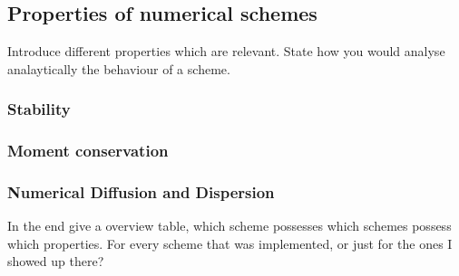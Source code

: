\subsection{Properties of numerical schemes}
Introduce different properties which are relevant. State how you would analyse analaytically the behaviour of a scheme.
\subsubsection{Stability}
\subsubsection{Moment conservation}
\subsubsection{Numerical Diffusion and Dispersion}
In the end give a overview table, which scheme possesses which schemes possess which properties.
For every scheme that was implemented, or just for the ones I showed up there?
